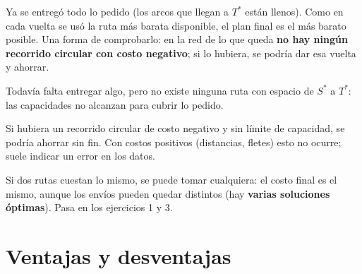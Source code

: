 \documentclass[11pt,a4paper]{article}
\newcommand{\Sini}{\ensuremath{S^{*}}}
\newcommand{\Tfin}{\ensuremath{T^{*}}}
\begin{document}
\begin{description}[leftmargin=0pt, itemsep=5pt]
  \item[Solución óptima.] Ya se entregó todo lo pedido (los arcos que llegan a \Tfin{} están llenos). Como en cada
        vuelta se usó la ruta más barata disponible, el plan final es el más barato posible. Una forma de
        comprobarlo: en la red de lo que queda \textbf{no hay ningún recorrido circular con costo negativo}; si lo
        hubiera, se podría dar esa vuelta y ahorrar.
  \item[Problema sin solución.] Todavía falta entregar algo, pero no existe ninguna ruta con espacio de \Sini{} a \Tfin:
        las capacidades no alcanzan para cubrir lo pedido.
  \item[Problema sin límite.] Si hubiera un recorrido circular de costo negativo y sin límite de capacidad, se podría
        ahorrar sin fin. Con costos positivos (distancias, fletes) esto no ocurre; suele indicar un error en los datos.
  \item[Empates.] Si dos rutas cuestan lo mismo, se puede tomar cualquiera: el costo final es el mismo, aunque los
        envíos pueden quedar distintos (hay \textbf{varias soluciones óptimas}). Pasa en los ejercicios 1 y 3.
\end{description}

\section{Ventajas y desventajas}
\end{document}
